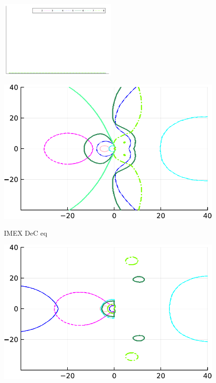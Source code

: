 \begin{figure}
	\centering
	\includegraphics[width=0.515\textwidth,trim={158 340 30 22}, clip]{pdf/odepics/colors_a-d_new_horiz_2-8_no_order.pdf}\\
	\begin{minipage}[t]{0.32\textwidth}
		\includegraphics[width=\textwidth]{pdf/odepics/ImExD1_IMEXDeC_equispaced_range=40-crop.pdf}
		\centerline{IMEX DeC eq}
	\end{minipage}
	\begin{minipage}[t]{0.32\textwidth}
	\includegraphics[width=\textwidth]{pdf/odepics/ImExD1_IMEXDeC_subtimesteps_equispaced_range=40-crop.pdf}

\end{minipage}
\end{figure}

